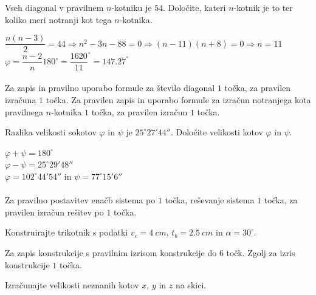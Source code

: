 \documentclass[addpoints]{exam}
\begin{document}
\begin{questions}


    \question[4]
    Vseh diagonal v pravilnem $n$-kotniku je $54$. Določite, kateri $n$-kotnik je to ter koliko meri notranji kot tega $n$-kotnika.

    \begin{solution}[7cm]
        $ \dfrac{n(n-3)}{2}=44 \Rightarrow n^2-3n-88=0 \Rightarrow (n-11)(n+8)=0 \Rightarrow n=11 $ \\
        $ \varphi=\dfrac{n-2}{n}180^\circ=\dfrac{1620}{11}^\circ=147.\overline{27}^\circ $ \\ \\
        Za zapis in pravilno uporabo formule za število diagonal $1$ točka, za pravilen izračuna $1$ točka. 
        Za pravilen zapis in uporabo formule za izračun notranjega kota pravilnega $n$-kotnika $1$ točka, za pravilen izračun $1$ točka.
    \end{solution}



    \question[5]
    Razlika velikosti sokotov $\varphi$ in $\psi$ je $25^\circ 27' 44''$.
    Določite velikosti kotov $\varphi$ in $\psi$.

    \begin{solution}[5cm]
        $\varphi+\psi=180^\circ$ \\
        $\varphi-\psi=25^\circ 29' 48''$ \\
        $\varphi=102^\circ 44' 54''$ in $\psi=77^\circ 15' 6 ''$ \\ \\
        Za pravilno postavitev enačb sistema po $1$ točka, reševanje sistema $1$ točka, za pravilen izračun rešitev po $1$ točka.
    \end{solution}

    

    \newpage

    \question[8]
    Konstruirajte trikotnik s podatki $v_c=4~cm$, $t_b=2.5~cm$ in $\alpha=30^\circ$.

    \begin{solution}[15cm]
        Za zapis konstrukcije s pravilnim izrisom konstrukcije do $6$ točk. Zgolj za izris konstrukcije $1$ točka.
    \end{solution}




    \newpage

    \question[6]
    Izračunajte velikosti neznanih kotov $x$, $y$ in $z$ na skici.


\end{questions}
\end{document}
